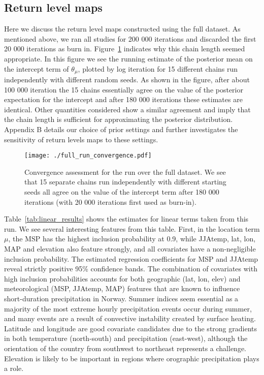 \documentclass[11pt,english]{article}
\begin{document}
\subsection{Return level maps}\label{sec:full_results}
Here we discuss the return level maps constructed using the full dataset.  As mentioned above, we ran all studies for 200 000 iterations and discarded the first 20 000 iterations as burn in.  Figure~\ref{fig:convergence} indicates why this chain length seemed appropriate.  In this figure we see the running estimate of the posterior mean on the intercept term of $\theta_\mu$, plotted by log iteration for 15 different chains run independently with different random seeds.  As shown in the figure, after about 100 000 iteration the 15 chains essentially agree on the value of the posterior expectation for the intercept and after 180 000 iterations these estimates are identical.  Other quantities considered show a similar agreement and imply that the chain length is sufficient for approximating the posterior distribution.  Appendix B details our choice of prior settings and further investigates the sensitivity of return levels maps to these settings.
\begin{figure}
\begin{center}
\texttt{[image: ./full\_run\_convergence.pdf]}
\end{center}
\caption{Convergence assessment for the run over the full dataset.  We see that 15 separate chains run independently with different starting seeds all agree on the value of the intercept term after 180 000 iterations (with 20 000 iterations first used as burn-in).}\label{fig:convergence}
\end{figure}

Table~\ref{tab:linear_results} shows the estimates for linear terms taken from this run.  We see several interesting features from this table.  First, in the location term $\mu$, the MSP has the highest inclusion probability at 0.9, while JJAtemp, lat, lon, MAP and elevation also feature strongly, and all covariates have a non-negligible inclusion probability. The estimated regression coefficients for MSP and JJAtemp reveal strictly positive 95\% confidence bands. The combination of covariates with high inclusion probabilities accounts for both geographic (lat, lon, elev) and meteorological (MSP, JJAtemp, MAP) features that are known to influence short-duration precipitation in Norway. Summer indices seem essential as a majority of the most extreme hourly precipitation events occur during summer, and many events are a result of convective instability created by surface heating. Latitude and longitude are good covariate candidates due to the strong gradients in both temperature (north-south) and precipitation (east-west), although the orientation of the country from southwest to northeast represents a challenge. 
Elevation is likely to be important in regions where orographic precipitation plays a role.
\end{document}
